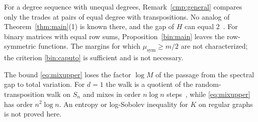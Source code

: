 For a degree sequence with unequal degrees, Remark~\ref{cmp:general} compares
only the trades at pairs of equal degree with transpositions. No analog of
Theorem~\ref{thm:main}(1) is known there, and the gap of $H$ can equal
$2$~\cite[Theorem~1.1]{S26}. For binary matrices with equal row sums,
Proposition~\ref{bin:main} leaves the row-symmetric functions. The
margins for which $\mu_{\mathrm{sym}}\ge m/2$ are not characterized; the
criterion \eqref{bin:caputo} is sufficient and is not necessary.

The bound \eqref{eq:mixupper} loses the factor $\log M$ of the passage from
the spectral gap to total variation. For $d=1$ the walk is a quotient of the
random-transposition walk on $S_n$ and mixes in order $n\log n$
steps~\cite{DS81,DH02}, while \eqref{eq:mixupper} has order $n^2\log n$. An
entropy or log-Sobolev inequality for $K$ on regular graphs is not proved
here.
